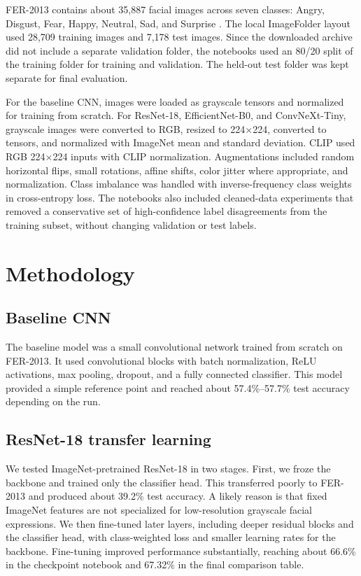 \documentclass{article}
\begin{document}
FER-2013 contains about 35,887 facial images across seven classes: Angry, Disgust, Fear, Happy, Neutral, Sad, and Surprise \citep{kagglefer2013}. The local ImageFolder layout used 28,709 training images and 7,178 test images. Since the downloaded archive did not include a separate validation folder, the notebooks used an 80/20 split of the training folder for training and validation. The held-out test folder was kept separate for final evaluation.

For the baseline CNN, images were loaded as grayscale tensors and normalized for training from scratch. For ResNet-18, EfficientNet-B0, and ConvNeXt-Tiny, grayscale images were converted to RGB, resized to 224$\times$224, converted to tensors, and normalized with ImageNet mean and standard deviation. CLIP used RGB 224$\times$224 inputs with CLIP normalization. Augmentations included random horizontal flips, small rotations, affine shifts, color jitter where appropriate, and normalization. Class imbalance was handled with inverse-frequency class weights in cross-entropy loss. The notebooks also included cleaned-data experiments that removed a conservative set of high-confidence label disagreements from the training subset, without changing validation or test labels.

\section{Methodology}

\subsection{Baseline CNN}

The baseline model was a small convolutional network trained from scratch on FER-2013. It used convolutional blocks with batch normalization, ReLU activations, max pooling, dropout, and a fully connected classifier. This model provided a simple reference point and reached about 57.4\%--57.7\% test accuracy depending on the run.

\subsection{ResNet-18 transfer learning}

We tested ImageNet-pretrained ResNet-18 \citep{he2016deep} in two stages. First, we froze the backbone and trained only the classifier head. This transferred poorly to FER-2013 and produced about 39.2\% test accuracy. A likely reason is that fixed ImageNet features are not specialized for low-resolution grayscale facial expressions. We then fine-tuned later layers, including deeper residual blocks and the classifier head, with class-weighted loss and smaller learning rates for the backbone. Fine-tuning improved performance substantially, reaching about 66.6\% in the checkpoint notebook and 67.32\% in the final comparison table.
\end{document}
